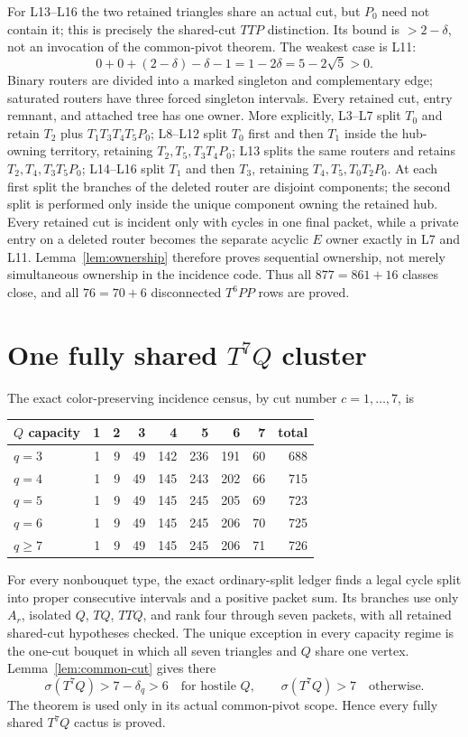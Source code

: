 \documentclass[11pt]{article}
\newcommand{\sig}{\sigma}
\begin{document}
For L13--L16 the two retained triangles share an actual cut, but $P_0$ need
not contain it; this is precisely the shared-cut $TTP$ distinction.  Its bound
is $>2-\delta$, not an invocation of the common-pivot theorem.  The weakest
case is L11:
\[
 0+0+(2-\delta)-\delta-1=1-2\delta=5-2\sqrt5>0.
\]
Binary routers are divided into a marked singleton and complementary edge;
saturated routers have three forced singleton intervals.  Every retained cut,
entry remnant, and attached tree has one owner.  More explicitly, L3--L7 split
$T_0$ and retain $T_2$ plus $T_1T_3T_4T_5P_0$; L8--L12 split $T_0$ first and
then $T_1$ inside the hub-owning territory, retaining $T_2,T_5,T_3T_4P_0$;
L13 splits the same routers and retains $T_2,T_4,T_3T_5P_0$; L14--L16 split
$T_1$ and then $T_3$, retaining $T_4,T_5,T_0T_2P_0$.  At each first split the
branches of the deleted router are disjoint components; the second split is
performed only inside the unique component owning the retained hub.  Every
retained cut is incident only with cycles in one final packet, while a private
entry on a deleted router becomes the separate acyclic $E$ owner exactly in
L7 and L11.  Lemma~\ref{lem:ownership} therefore proves sequential ownership,
not merely simultaneous ownership in the incidence code.  Thus all
$877=861+16$ classes
close, and all $76=70+6$ disconnected $T^6PP$ rows are proved.

\section{\texorpdfstring{One fully shared $T^7Q$ cluster}{One fully shared T7Q cluster}}

The exact color-preserving incidence census, by cut number $c=1,\ldots,7$, is
\begin{center}
\begin{tabular}{lrrrrrrr|r}
\toprule
$Q$ capacity&1&2&3&4&5&6&7&total\\
\midrule
$q=3$&1&9&49&142&236&191&60&688\\
$q=4$&1&9&49&145&243&202&66&715\\
$q=5$&1&9&49&145&245&205&69&723\\
$q=6$&1&9&49&145&245&206&70&725\\
$q\geq7$&1&9&49&145&245&206&71&726\\
\bottomrule
\end{tabular}
\end{center}
For every nonbouquet type, the exact ordinary-split ledger finds a legal
cycle split into proper consecutive intervals and a positive packet sum.  Its
branches use only $A_r$, isolated $Q$, $TQ$, $TTQ$, and rank four through seven
packets, with all retained shared-cut hypotheses checked.  The unique exception
in every capacity regime is the one-cut bouquet in which all seven triangles
and $Q$ share one vertex.  Lemma~\ref{lem:common-cut} gives there
\[
 \sig(T^7Q)>7-\delta_q>6\quad\text{for hostile $Q$},
 \qquad \sig(T^7Q)>7\quad\text{otherwise}.
\]
The theorem is used only in its actual common-pivot scope.  Hence every fully
shared $T^7Q$ cactus is proved.
\end{document}

